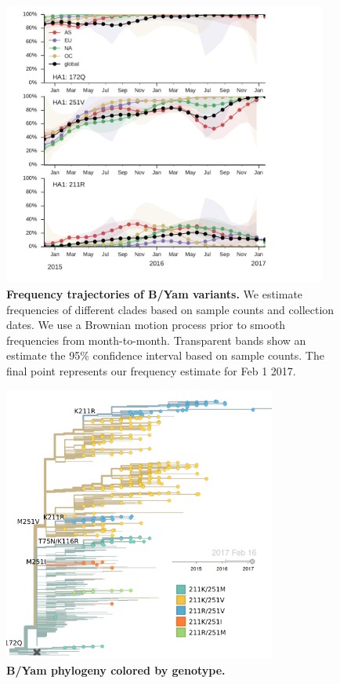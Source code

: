 \documentclass[11pt,oneside,letterpaper]{article}
\begin{document}
\begin{figure}[H]
	\centering
	\includegraphics[width=0.95\textwidth]{../figures/feb-2017/yam_frequencies.pdf}
	\caption{\textbf{Frequency trajectories of B/Yam variants.}
	We estimate frequencies of different clades based on sample counts and collection dates.
	We use a Brownian motion process prior to smooth frequencies from month-to-month.
	Transparent bands show an estimate the 95\% confidence interval based on sample counts.
	The final point represents our frequency estimate for Feb 1 2017.
	}
	\label{Yam_mutations}
\end{figure}

\begin{figure}[H]
	\centering
	\includegraphics[width=0.8\textwidth]{../figures/feb-2017/yam_tree.png}
	\caption{\textbf{B/Yam phylogeny colored by genotype.}
	}
	\label{Yam_tree}
\end{figure}
\end{document}
